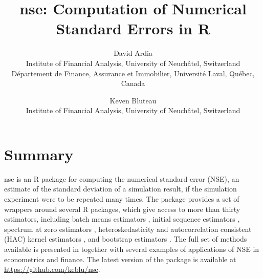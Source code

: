 \documentclass[11pt]{article}
\begin{document}
\title{nse: Computation of Numerical Standard Errors in R}
\author{David Ardia\\
Institute of Financial Analysis, University of Neuch\^atel, Switzerland\\
D\'epartement de Finance, Assurance et Immobilier, Universit\'e Laval, Qu\'ebec, Canada
\and
Keven Bluteau\\
Institute of Financial Analysis, University of Neuch\^atel, Switzerland\\
}
	
\maketitle

\section*{Summary}

nse is an R package \citep{R} for computing the numerical standard error (NSE), an estimate of the
standard deviation of a simulation result, if the simulation experiment were to be repeated
many times. The package provides a set of wrappers around several R packages, which give access to more than thirty estimators, including 
batch means estimators \citep[][Section~3.2]{Geyer1992}, initial sequence estimators \citet[][Equation~3.3]{Geyer1992}, spectrum at zero estimators \citep{HeidelbergerWelch1981,FlegalJones2010}, heteroskedasticity and autocorrelation 
consistent (HAC) kernel estimators \citep{NeweyWest1987,Andrews1991,AndrewsMonahan1992,NeweyWest1994,Hirukawa2010}, and bootstrap estimators \citet{PolitisRomano1992,PolitisRomano1994,PolitisWhite2004}. 
The full set of methods available is 
presented in \citet{ArdiaEtAl2016} together with several examples of applications of NSE in econometrics and finance. The latest version of the package is available at \url{https://github.com/keblu/nse}.



	
\end{document}
